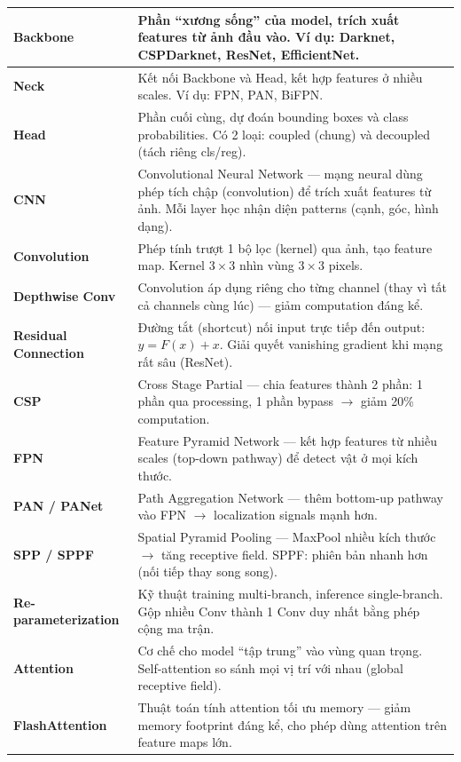 \begin{longtable}{p{3.5cm}p{12cm}}
\textbf{Backbone} & Phần ``xương sống'' của model, trích xuất features từ ảnh đầu vào. Ví dụ: Darknet, CSPDarknet, ResNet, EfficientNet. \\
\midrule
\textbf{Neck} & Kết nối Backbone và Head, kết hợp features ở nhiều scales. Ví dụ: FPN, PAN, BiFPN. \\
\midrule
\textbf{Head} & Phần cuối cùng, dự đoán bounding boxes và class probabilities. Có 2 loại: coupled (chung) và decoupled (tách riêng cls/reg). \\
\midrule
\textbf{CNN} & Convolutional Neural Network --- mạng neural dùng phép tích chập (convolution) để trích xuất features từ ảnh. Mỗi layer học nhận diện patterns (cạnh, góc, hình dạng). \\
\midrule
\textbf{Convolution} & Phép tính trượt 1 bộ lọc (kernel) qua ảnh, tạo feature map. Kernel $3\times3$ nhìn vùng $3\times3$ pixels. \\
\midrule
\textbf{Depthwise Conv} & Convolution áp dụng riêng cho từng channel (thay vì tất cả channels cùng lúc) --- giảm computation đáng kể. \\
\midrule
\textbf{Residual Connection} & Đường tắt (shortcut) nối input trực tiếp đến output: $y = F(x) + x$. Giải quyết vanishing gradient khi mạng rất sâu (ResNet). \\
\midrule
\textbf{CSP} & Cross Stage Partial --- chia features thành 2 phần: 1 phần qua processing, 1 phần bypass $\rightarrow$ giảm 20\% computation. \\
\midrule
\textbf{FPN} & Feature Pyramid Network --- kết hợp features từ nhiều scales (top-down pathway) để detect vật ở mọi kích thước. \\
\midrule
\textbf{PAN / PANet} & Path Aggregation Network --- thêm bottom-up pathway vào FPN $\rightarrow$ localization signals mạnh hơn. \\
\midrule
\textbf{SPP / SPPF} & Spatial Pyramid Pooling --- MaxPool nhiều kích thước $\rightarrow$ tăng receptive field. SPPF: phiên bản nhanh hơn (nối tiếp thay song song). \\
\midrule
\textbf{Re-parameterization} & Kỹ thuật training multi-branch, inference single-branch. Gộp nhiều Conv thành 1 Conv duy nhất bằng phép cộng ma trận. \\
\midrule
\textbf{Attention} & Cơ chế cho model ``tập trung'' vào vùng quan trọng. Self-attention so sánh mọi vị trí với nhau (global receptive field). \\
\midrule
\textbf{FlashAttention} & Thuật toán tính attention tối ưu memory --- giảm memory footprint đáng kể, cho phép dùng attention trên feature maps lớn. \\
\bottomrule
\end{longtable}

